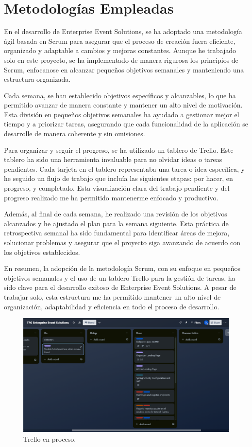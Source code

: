 \section{Metodologías Empleadas}

En el desarrollo de Enterprise Event Solutions, se ha adoptado una metodología ágil basada en Scrum para asegurar que el proceso de creación 
fuera eficiente, organizado y adaptable a cambios y mejoras constantes. Aunque he trabajado solo en este proyecto, se ha implementado de manera 
rigurosa los principios de Scrum, enfocanose en alcanzar pequeños objetivos semanales y manteniendo una estructura organizada.

Cada semana, se han establecido objetivos específicos y alcanzables, lo que ha permitido avanzar de manera constante y mantener un alto nivel 
de motivación. Esta división en pequeños objetivos semanales ha ayudado a gestionar mejor el tiempo y a priorizar tareas, asegurando que cada 
funcionalidad de la aplicación se desarrolle de manera coherente y sin omisiones.

Para organizar y seguir el progreso, se ha utilizado un tablero de Trello. Este tablero ha sido una herramienta invaluable para no olvidar ideas o 
tareas pendientes. Cada tarjeta en el tablero representaba una tarea o idea específica, y he seguido un flujo de trabajo que incluía las siguientes 
etapas: por hacer, en progreso, y completado. Esta visualización clara del trabajo pendiente y del progreso realizado me ha permitido mantenerme 
enfocado y productivo.

Además, al final de cada semana, he realizado una revisión de los objetivos alcanzados y he ajustado el plan para la semana siguiente. Esta práctica 
de retrospectiva semanal ha sido fundamental para identificar áreas de mejora, solucionar problemas y asegurar que el proyecto siga avanzando de acuerdo 
con los objetivos establecidos.

En resumen, la adopción de la metodología Scrum, con su enfoque en pequeños objetivos semanales y el uso de un tablero Trello para la gestión de 
tareas, ha sido clave para el desarrollo exitoso de Enterprise Event Solutions. A pesar de trabajar solo, esta estructura me ha permitido mantener 
un alto nivel de organización, adaptabilidad y eficiencia en todo el proceso de desarrollo.
\newpage

\begin{figure}[h]
    \includegraphics[width=\linewidth]{Trello.png}
    \caption{Trello en proceso.}
    \label{fig:metodologias1}
\end{figure}

